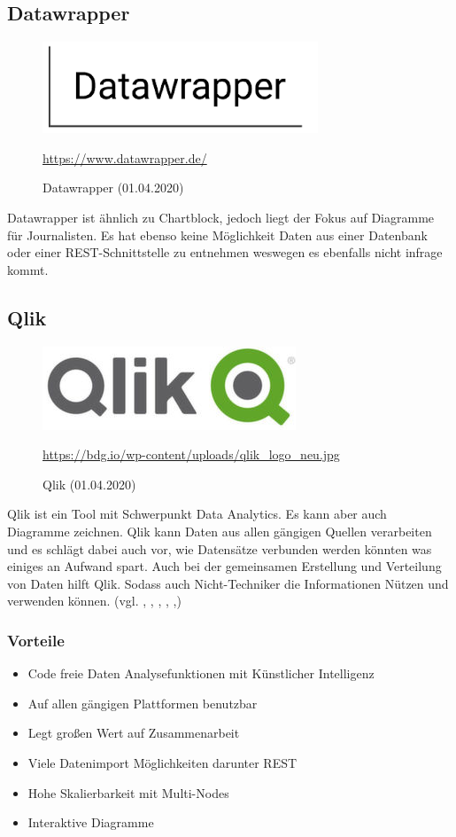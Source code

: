 \subsection{Datawrapper}
\begin{figure}[H]
    \includegraphics[scale=1]{images/dwLogo.PNG}
    \caption{Datawrapper (01.04.2020)}
     \centering
     \url{https://www.datawrapper.de/} 
\end{figure}
Datawrapper ist ähnlich zu Chartblock, jedoch liegt der Fokus auf Diagramme für Journalisten. Es hat ebenso keine Möglichkeit Daten aus einer Datenbank oder einer REST-Schnittstelle zu entnehmen weswegen es ebenfalls nicht infrage kommt.
\subsection{Qlik}
\begin{figure}[H]
    \includegraphics[scale=1]{images/qlikLogo.PNG}
    \caption{Qlik (01.04.2020)}
     \centering
     \url{https://bdg.io/wp-content/uploads/qlik_logo_neu.jpg} 
\end{figure}
Qlik ist ein Tool mit Schwerpunkt Data Analytics. Es kann aber auch Diagramme zeichnen.
Qlik kann Daten aus allen gängigen Quellen verarbeiten und es schlägt dabei auch vor, wie Datensätze verbunden werden könnten was einiges an Aufwand spart. Auch bei der gemeinsamen Erstellung und Verteilung von Daten hilft Qlik. Sodass auch Nicht-Techniker die Informationen Nützen und verwenden können. (vgl. \cite{qlik_using_2017}, \cite{noauthor_swapi_2019}, \cite{noauthor_qlik_nodate}, \cite{noauthor_qlik_2019-1}, \cite{noauthor_qlik_2019-2},\cite{noauthor_qlik_2019-3})
\subsubsection{Vorteile} 
\begin{itemize}
\item Code freie Daten Analysefunktionen mit Künstlicher Intelligenz
\item Auf allen gängigen Plattformen benutzbar
\item Legt großen Wert auf Zusammenarbeit
\item Viele Datenimport Möglichkeiten darunter REST
\item Hohe Skalierbarkeit mit Multi-Nodes
\item Interaktive Diagramme
\end{itemize}
